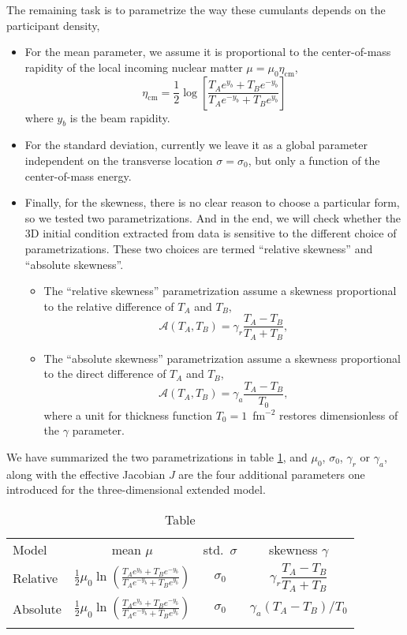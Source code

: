 The remaining task is to parametrize the way these cumulants depends on the participant density,
\begin{itemize}
\item For the mean parameter, we assume it is proportional to the center-of-mass rapidity of the local incoming nuclear matter $\mu = \mu_0\eta_\text{cm}$,
\begin{equation}
  \eta_\text{cm}=\frac{1}{2} \log \left[\frac{T_A e^{y_b}+T_Be^{-y_b}}{T_A e^{-y_b}+T_B e^{y_b}}\right]
\end{equation}
where $y_b$ is the beam rapidity.

\item For the standard deviation, currently we leave it as a global parameter independent on the transverse location $\sigma = \sigma_0$, but only a function of the center-of-mass energy.
\item Finally, for the skewness, there is no clear reason to choose a particular form, so we tested two parametrizations. And in the end, we will check whether the 3D initial condition extracted from data is sensitive to the different choice of parametrizations.
These two choices are termed ``relative skewness'' and ``absolute skewness''.
\begin{itemize}
\item The ``relative skewness'' parametrization assume a skewness proportional to the relative difference of $T_A$ and $T_B$,
\begin{equation}
  \mathcal{A}(T_A, T_B) = \gamma_r\frac{T_A - T_B}{T_A + T_B},
\end{equation}
\item The ``absolute skewness'' parametrization assume a skewness proportional to the direct difference of $T_A$ and $T_B$,
\begin{equation}
  \mathcal{A}(T_A, T_B) = \gamma_a \frac{T_A - T_B}{T_0},
\end{equation}
where a unit for thickness function $T_0=1$~fm$^{-2}$ restores dimensionless of the $\gamma$ parameter.
\end{itemize}
\end{itemize}
We have summarized the two parametrizations in table \ref{tab:parametrization}, and $\mu_0$, $\sigma_0$, $\gamma_r$ or $\gamma_a$, along with the effective Jacobian $J$ are the four additional parameters one introduced for the three-dimensional extended \trento model.
\begin{table}
\centering
\caption{Table}\label{tab:parametrization}
\begin{tabular}{lccc}
\paddedhline
Model & mean $\mu$ & std.\ $\sigma$ & skewness $\gamma$ \\
\paddedhline \noalign{\smallskip}
Relative  & $\frac{1}{2} \mu_0 \ln\left(\frac{T_A e^{y_b}+T_B e^{-y_b}}{T_A e^{-y_b} + T_B e^{y_b}}\right)$ & $\sigma_0$ & $\gamma_r \dfrac{T_A - T_B}{T_A + T_B}$ \smallskip\\
Absolute & $\frac{1}{2} \mu_0 \ln\left(\frac{T_A e^{y_b}+T_B e^{-y_b}}{T_A e^{-y_b} + T_B e^{y_b}}\right)$  & $\sigma_0$ & $\gamma_a (T_A - T_B)/T_0$\smallskip\\
\paddedhline 
\end{tabular}
\end{table}

